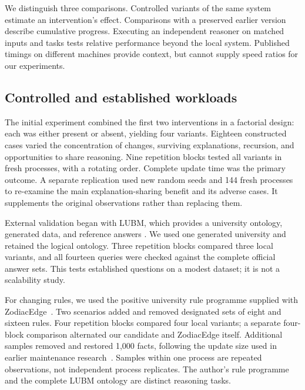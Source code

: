 We distinguish three comparisons. Controlled variants of the same system
estimate an intervention's effect. Comparisons with a preserved earlier
version describe cumulative progress. Executing an independent reasoner on
matched inputs and tasks tests relative performance beyond the local system.
Published timings on different machines provide context, but cannot supply
speed ratios for our experiments.

\subsection{Controlled and established workloads}
The initial experiment combined the first two interventions in a factorial
design: each was either present or absent, yielding four variants. Eighteen
constructed cases varied the concentration of changes, surviving explanations,
recursion, and opportunities to share reasoning. Nine repetition blocks tested
all variants in fresh processes, with a rotating order. Complete update time
was the primary outcome. A separate replication used new random seeds and
144 fresh processes to re-examine the main explanation-sharing benefit and its
adverse cases. It supplements the original observations rather than replacing
them.

External validation began with LUBM, which
provides a university ontology, generated data, and reference answers
\cite{guo2005,lubmwebsite}. We used one generated university and retained the
logical ontology. Three repetition blocks compared three local variants, and
all fourteen queries were checked against the complete official answer sets.
This tests established questions on a modest dataset; it is not a scalability
study.

For changing rules, we used the positive university rule programme supplied
with ZodiacEdge~\cite{xu2023,zodiacartifact}. Two scenarios added and removed
designated sets of eight and sixteen rules. Four repetition blocks compared
four local variants; a separate four-block comparison alternated our candidate
and ZodiacEdge itself. Additional samples removed and restored 1,000 facts,
following the update size used in earlier maintenance research~\cite{hu2018}.
Samples within one process are repeated observations, not independent process
replicates. The author's rule programme and the complete LUBM ontology are
distinct reasoning tasks.

